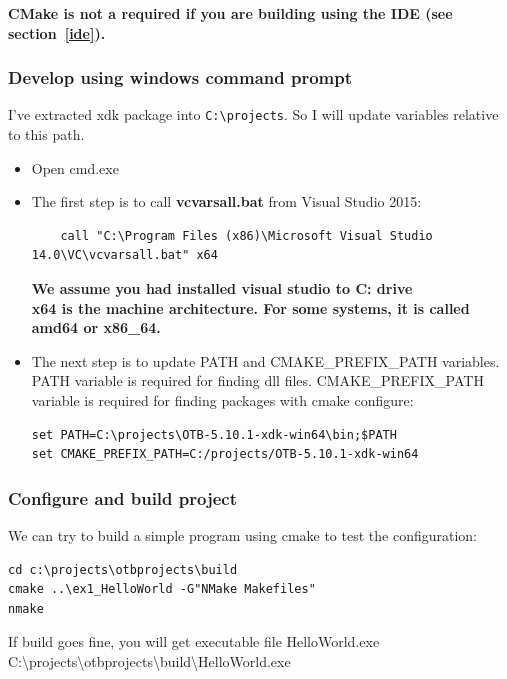 \documentclass[10pt,a4paper]{article}
\begin{document}
\textbf{CMake is not a required if you are building using the IDE (see section~\ref{ide}).}

\subsubsection{Develop using windows command prompt}
I've extracted xdk package into \texttt{C:{\textbackslash}projects}. So I will
update variables relative to this path.

\begin{itemize}
  \item Open cmd.exe
  \item The first step is to call \textbf{vcvarsall.bat} from Visual Studio 2015:
  \begin{verbatim}
    call "C:\Program Files (x86)\Microsoft Visual Studio 14.0\VC\vcvarsall.bat" x64
  \end{verbatim}
  \textbf{We assume you had installed visual studio to C: drive} \\
  \textbf{x64 is the machine architecture. For some systems, it is called amd64 or
  x86\_64.}
  \item The next step is to update PATH and CMAKE\_PREFIX\_PATH variables. PATH variable
is required for finding dll files. CMAKE\_PREFIX\_PATH variable is required for
finding packages with cmake configure:
\begin{verbatim}
set PATH=C:\projects\OTB-5.10.1-xdk-win64\bin;$PATH
set CMAKE_PREFIX_PATH=C:/projects/OTB-5.10.1-xdk-win64
\end{verbatim}

\end{itemize}
  
\subsubsection{Configure and build project}

We can try to build a simple program using cmake to test the configuration:

\begin{verbatim}
cd c:\projects\otbprojects\build
cmake ..\ex1_HelloWorld -G"NMake Makefiles"
nmake
\end{verbatim}
If build goes fine, you will get executable file HelloWorld.exe
\newline
C:{\textbackslash}projects{\textbackslash}otbprojects{\textbackslash}build{\textbackslash}HelloWorld.exe
\newline
\end{document}
